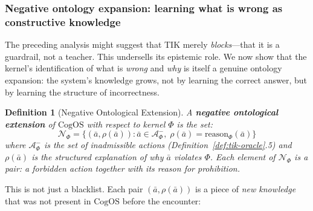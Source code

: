 \documentclass[11pt]{article}
\newtheorem{definition}{Definition}
\newcommand{\CogOS}{\text{CogOS}}
\begin{document}

\subsubsection{Negative ontology expansion: learning what is wrong as
constructive knowledge}
\label{sec:negative-ontology}

The preceding analysis might suggest that TIK merely \textit{blocks}---that it
is a guardrail, not a teacher. This undersells its epistemic role. We now show
that the kernel's identification of what is \textit{wrong} and \textit{why} is
itself a genuine ontology expansion: the system's knowledge grows, not by
learning the correct answer, but by learning the structure of incorrectness.

\begin{definition}[Negative Ontological Extension]
\label{def:neg-extension}
A \textbf{negative ontological extension} of $\CogOS$ with respect to kernel
$\Phi$ is the set:
\begin{equation}
\mathcal{N}_\Phi = \bigl\{(\bar{a}, \rho(\bar{a})) :
    \bar{a} \in \mathcal{A}^-_\Phi,\;
    \rho(\bar{a}) = \text{reason}_\Phi(\bar{a})\bigr\}
\end{equation}
where $\mathcal{A}^-_\Phi$ is the set of inadmissible actions
(Definition~\ref{def:tik-oracle}.5) and $\rho(\bar{a})$ is the
\textit{structured explanation} of \textit{why} $\bar{a}$ violates $\Phi$.
Each element of $\mathcal{N}_\Phi$ is a pair: a forbidden action together
with its reason for prohibition.
\end{definition}

\noindent This is not just a blacklist. Each pair
$(\bar{a}, \rho(\bar{a}))$ is a piece of \textit{new knowledge} that was not
present in $\CogOS$ before the encounter:
\end{document}
